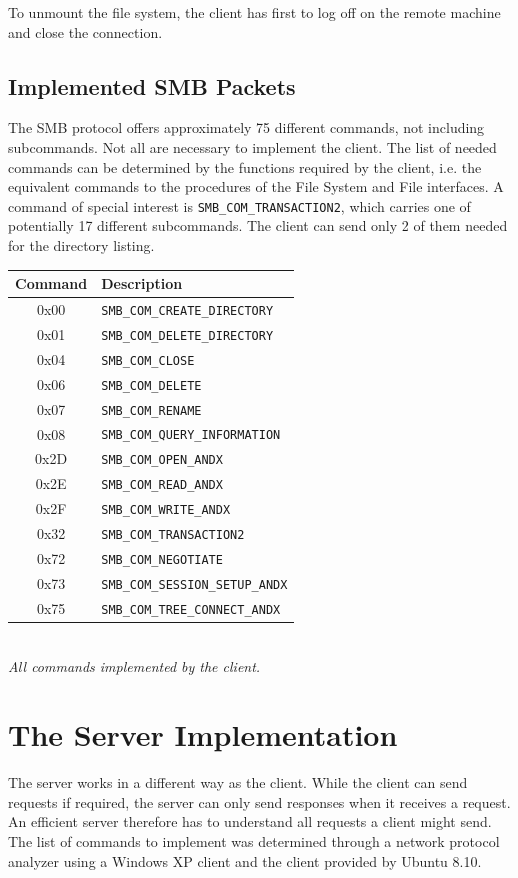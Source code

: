 \documentclass[11pt,a4paper]{book}
\begin{document}
To unmount the file system, the client has first to log off on the remote machine and close the connection.

\subsection{Implemented SMB Packets}
The SMB protocol offers approximately 75 different commands, not including subcommands. Not all are necessary to implement the client. The list of needed commands can be determined by the functions required by the client, i.e. the equivalent commands to the procedures of the File System and File interfaces. A command of special interest is \texttt{SMB\_COM\_TRANSACTION2}, which carries one of potentially 17 different subcommands. The client can send only 2 of them needed for the directory listing.

\begin{center}
\begin{tabular}{c|l}
Command & Description \\ 
\hline
0x00 & \texttt{SMB\_COM\_CREATE\_DIRECTORY} \\
0x01 & \texttt{SMB\_COM\_DELETE\_DIRECTORY} \\
0x04 & \texttt{SMB\_COM\_CLOSE} \\
0x06 & \texttt{SMB\_COM\_DELETE} \\
0x07 & \texttt{SMB\_COM\_RENAME} \\
0x08 & \texttt{SMB\_COM\_QUERY\_INFORMATION} \\
0x2D & \texttt{SMB\_COM\_OPEN\_ANDX} \\
0x2E & \texttt{SMB\_COM\_READ\_ANDX} \\
0x2F & \texttt{SMB\_COM\_WRITE\_ANDX} \\
0x32 & \texttt{SMB\_COM\_TRANSACTION2} \\
0x72 & \texttt{SMB\_COM\_NEGOTIATE} \\
0x73 & \texttt{SMB\_COM\_SESSION\_SETUP\_ANDX} \\
0x75 & \texttt{SMB\_COM\_TREE\_CONNECT\_ANDX} \\
\end{tabular} \\
\vspace{6pt}
\textit{All commands implemented by the client.}
\end{center}

\section{The Server Implementation}
The server works in a different way as the client. While the client can send requests if required, the server can only send responses when it receives a request. An efficient server therefore has to understand all requests a client might send. The list of commands to implement was determined through a network protocol analyzer using a Windows XP client and the client provided by Ubuntu 8.10.
\end{document}

